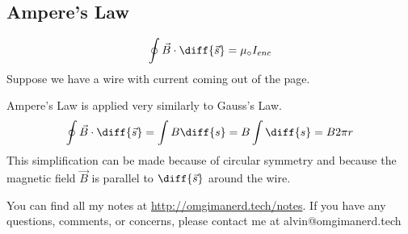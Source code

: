 \documentclass{math}
\begin{document}
\subsection*{Ampere's Law}
\[ \oint\vec{B}\cdot\diff{\vec{s}} = \mu_{\circ}I_{enc} \]
Suppose we have a wire with current coming out of the page.
\begin{center}
\end{center}
Ampere's Law is applied very similarly to Gauss's Law.
\[ \oint\vec{B}\cdot\diff{\vec{s}} = \int B\diff{s} = B\int\diff{s} = B2\pi r \]
This simplification can be made because of circular symmetry and because the
magnetic field \( \vec{B} \) is parallel to \( \diff{\vec{s}} \) around the
wire.

\begin{center}
  You can find all my notes at \url{http://omgimanerd.tech/notes}. If you have
  any questions, comments, or concerns, please contact me at
  alvin@omgimanerd.tech
\end{center}
\end{document}
